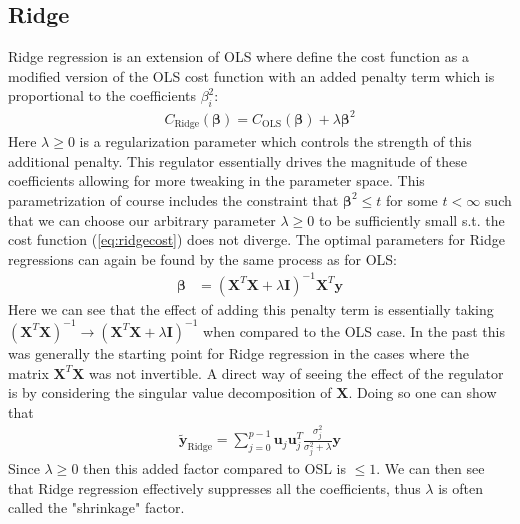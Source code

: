 \documentclass[%
reprint,
amsmath,amssymb,
aps,
pra,
]{revtex4-2}
\begin{document}
\subsection{Ridge}
Ridge regression is an extension of OLS where define the cost function as a modified version of the OLS cost function with an added penalty term which is proportional to the coefficients $\beta_i^2$:
\begin{align}
	C_\text{Ridge}(\bm\beta)=C_\text{OLS}(\bm\beta)+\lambda\bm\beta^2
	\label{eq:ridgecost}
\end{align}
Here $\lambda\geq0$ is a regularization parameter which controls the strength of this additional penalty. This regulator essentially drives the magnitude of these coefficients allowing for more tweaking in the parameter space. This parametrization of course includes the constraint that $\bm{\beta}^2\leq t$ for some $t<\infty$ such that we can choose our arbitrary parameter $\lambda\geq0$ to be sufficiently small s.t. the cost function (\ref{eq:ridgecost}) does not diverge. The optimal parameters for Ridge regressions can again be found by the same process as for OLS:
\begin{align*}
	\bm{\beta}&=(\bm{X}^T\bm{X}+\lambda\bm{I})^{-1}\bm{X}^T\bm{y}
\end{align*}
Here we can see that the effect of adding this penalty term is essentially taking $(\bm X^T\bm X)^{-1}\to(\bm X^T\bm X+\lambda\bm I)^{-1}$ when compared to the OLS case. In the past this was generally the starting point for Ridge regression in the cases where the matrix $\bm X^T\bm X$ was not invertible. A direct way of seeing the effect of the regulator is by considering the singular value decomposition of $\bm X$. Doing so one can show that 
\begin{align*}
	\tilde{\bm{y}}_\text{Ridge}=\sum_{j=0}^{p-1}\bm{u}_j\bm{u}_j^T\frac{\sigma_j^2}{\sigma_j^2+\lambda}\bm{y}
\end{align*}
Since $\lambda\geq0$ then this added factor compared to OSL is $\leq1$. We can then see that Ridge regression effectively suppresses all the coefficients, thus $\lambda$ is often called the "shrinkage" factor. 
\end{document}
